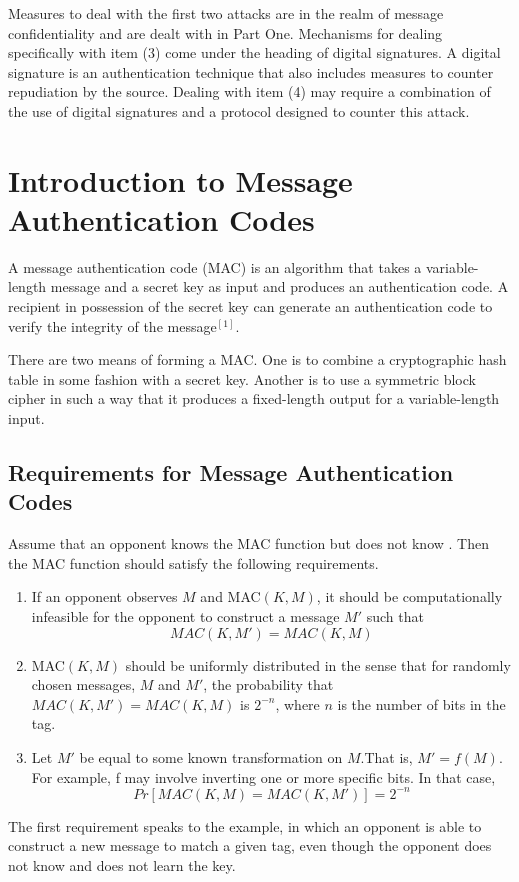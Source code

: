 \documentclass[12pt,a4paper,oneside]{report}
\begin{document}
Measures to deal with the first two attacks are in the realm of message confidentiality and are dealt with in Part One. Mechanisms for dealing specifically with item (3) come under the heading of digital signatures. A digital signature is an
authentication technique that also includes measures to counter repudiation by the source. Dealing with item (4) may require a combination of the use of digital signatures and a protocol designed to counter this attack.


\section{Introduction to Message Authentication Codes}
A message authentication code (MAC) is an algorithm that takes a variable-length message and a secret key as input and produces an authentication code. A recipient in possession of the secret key can generate an authentication code to verify the integrity of the message$^{[1]}$.

There are two means of forming a MAC. One is to combine a cryptographic hash table in some fashion with a secret key. Another is to use a symmetric block cipher in such a way that it produces a fixed-length output for a variable-length input.

\subsection{Requirements for Message Authentication Codes}
Assume that an opponent knows the MAC function but does not know . Then the MAC function should satisfy the following requirements.

\begin{enumerate}
    \item If an opponent observes $M$ and MAC$(K,M)$, it should be computationally infeasible for the opponent to construct a message $M'$ such that
    $$MAC(K,M') = MAC(K,M)$$
    \item MAC$(K,M)$ should be uniformly distributed in the sense that for randomly chosen messages, $M$ and $M'$, the probability that $MAC(K,M') = MAC(K,M)$ is $2^{-n}$, where $n$ is the number of bits in the tag.
    \item Let $M'$ be equal to some known transformation on $M$.That is, $M'=f(M)$. For example, f may involve inverting one or more specific bits. In that case,
    $$Pr[MAC(K,M)=MAC(K,M')] = 2^{-n}$$
\end{enumerate}

The first requirement speaks to the example, in which an opponent is able to construct a new message to match a given tag, even though the opponent does not know and does not learn the key.
\end{document}
